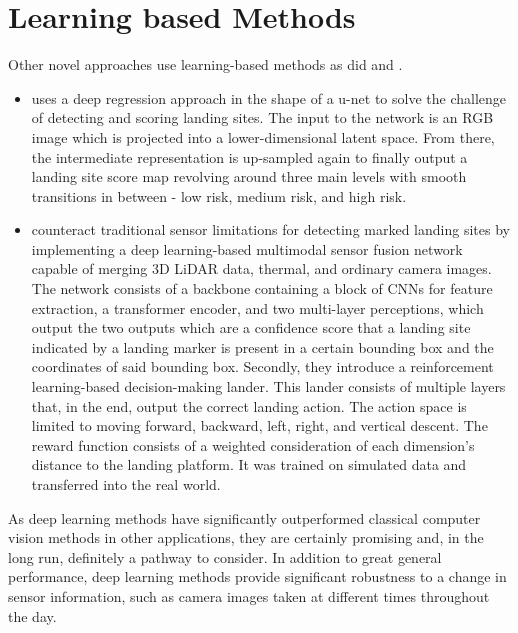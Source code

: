 \section{Learning based Methods}
Other novel approaches use learning-based methods as did \citep{Neves2024Multimodal, Abdollahzadeh2022SafeLandingZones} and \citep{TovanchePicon2024RealTimeSafeValidation}. 

\begin{itemize}
    \item \citet{Abdollahzadeh2022SafeLandingZones} uses a deep regression approach in the shape of a u-net to solve the challenge of detecting and scoring landing sites. The input to the network is an RGB image which is projected into a lower-dimensional latent space. From there, the intermediate representation is up-sampled again to finally output a landing site score map revolving around three main levels with smooth transitions in between - low risk, medium risk, and high risk.
    \item \citet{Neves2024Multimodal} counteract traditional sensor limitations for detecting marked landing sites by implementing a deep learning-based multimodal sensor fusion network capable of merging 3D LiDAR data, thermal, and ordinary camera images. The network consists of a backbone containing a block of CNNs for feature extraction, a transformer encoder, and two multi-layer perceptions, which output the two outputs which are a confidence score that a landing site indicated by a landing marker is present in a certain bounding box and the coordinates of said bounding box. Secondly, they introduce a reinforcement learning-based decision-making lander. This lander consists of multiple layers that, in the end, output the correct landing action. The action space is limited to moving forward, backward, left, right, and vertical descent. The reward function consists of a weighted consideration of each dimension's distance to the landing platform. It was trained on simulated data and transferred into the real world.
\end{itemize}

As deep learning methods have significantly outperformed classical computer vision methods in other applications, they are certainly promising and, in the long run, definitely a pathway to consider. In addition to great general performance, deep learning methods provide significant robustness to a change in sensor information, such as camera images taken at different times throughout the day. 

